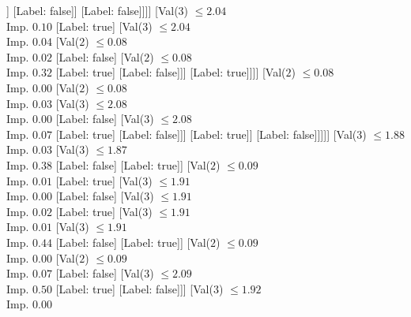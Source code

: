 \documentclass[margin=10pt]{standalone}
\begin{document}
\begin{forest}
																[Val($3$) $ \leq 2.02$ \\ Imp. $0.00$
																	[Val($3$) $ \leq 2.02$ \\ Imp. $0.13$
																		[Label: false]
																		[Label: true]]
																	[Label: false]]
																[Label: false]]]]
													[Val($3$) $ \leq 2.04$ \\ Imp. $0.10$
														[Label: true]
														[Val($3$) $ \leq 2.04$ \\ Imp. $0.04$
															[Val($2$) $ \leq 0.08$ \\ Imp. $0.02$
																[Label: false]
																[Val($2$) $ \leq 0.08$ \\ Imp. $0.32$
																	[Label: true]
																	[Label: false]]]
															[Label: true]]]]
												[Val($2$) $ \leq 0.08$ \\ Imp. $0.00$
													[Val($2$) $ \leq 0.08$ \\ Imp. $0.03$
														[Val($3$) $ \leq 2.08$ \\ Imp. $0.00$
															[Label: false]
															[Val($3$) $ \leq 2.08$ \\ Imp. $0.07$
																[Label: true]
																[Label: false]]]
														[Label: true]]
													[Label: false]]]]]
									[Val($3$) $ \leq 1.88$ \\ Imp. $0.03$
										[Val($3$) $ \leq 1.87$ \\ Imp. $0.38$
											[Label: false]
											[Label: true]]
										[Val($2$) $ \leq 0.09$ \\ Imp. $0.01$
											[Label: true]
											[Val($3$) $ \leq 1.91$ \\ Imp. $0.00$
												[Label: false]
												[Val($3$) $ \leq 1.91$ \\ Imp. $0.02$
													[Label: true]
													[Val($3$) $ \leq 1.91$ \\ Imp. $0.01$
														[Val($3$) $ \leq 1.91$ \\ Imp. $0.44$
															[Label: false]
															[Label: true]]
														[Val($2$) $ \leq 0.09$ \\ Imp. $0.00$
															[Val($2$) $ \leq 0.09$ \\ Imp. $0.07$
																[Label: false]
																[Val($3$) $ \leq 2.09$ \\ Imp. $0.50$
																	[Label: true]
																	[Label: false]]]
															[Val($3$) $ \leq 1.92$ \\ Imp. $0.00$

\end{forest}
\end{document}
